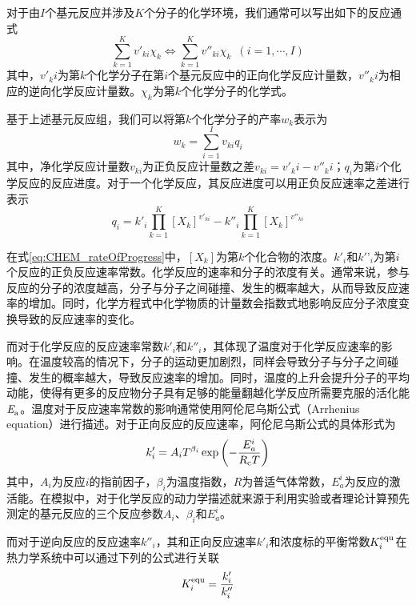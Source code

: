 对于由$I$个基元反应并涉及$K$个分子的化学环境，我们通常可以写出如下的反应通式
\begin{equation}
    \sum_{k=1}^Kv'_{ki}\chi_k\Leftrightarrow \sum_{k=1}^K v''_{ki}\chi_k\enspace\left(i=1,\cdots,I\right)
\end{equation}
其中，$v'_ki$为第$k$个化学分子在第$i$个基元反应中的正向化学反应计量数，$v''_ki$为相应的逆向化学反应计量数。$\chi_k$为第$k$个化学分子的化学式。

基于上述基元反应组，我们可以将第$k$个化学分子的产率$w_k$表示为\chinesecolon
\begin{equation}
    w_k=\sum_{i=1}^Iv_{ki}q_i
\end{equation}
其中，净化学反应计量数$v_{ki}$为正负反应计量数之差$v_{ki}=v'_ki-v''_ki$；$q_i$为第$i$个化学反应的反应进度。对于一个化学反应，其反应进度可以用正负反应速率之差进行表示\chinesecolon
\begin{equation}
    \label{eq:CHEM_rateOfProgress}
    q_i=k'_i\prod_{k=1}^{K}\left[X_k\right]^{v'_{ki}}-k''_i\prod_{k=1}^{K}\left[X_k\right]^{v''_{ki}}
\end{equation}

在式\ref{eq:CHEM_rateOfProgress}中，$\left[X_k\right]$为第$k$个化合物的浓度。$k'_i$和$k'’_i$为第$i$个反应的正负反应速率常数。化学反应的速率和分子的浓度有关。通常来说，参与反应的分子的浓度越高，分子与分子之间碰撞、发生的概率越大，从而导致反应速率的增加。同时，化学方程式中化学物质的计量数会指数式地影响反应分子浓度变换导致的反应速率的变化。

而对于化学反应的反应速率常数$k'_i$和$k''_i$，其体现了温度对于化学反应速率的影响。在温度较高的情况下，分子的运动更加剧烈，同样会导致分子与分子之间碰撞、发生的概率越大，导致反应速率的增加。同时，温度的上升会提升分子的平均动能，使得有更多的反应物分子具有足够的能量翻越化学反应所需要克服的活化能$\it E_{\rm a}^{\rm } \it$。温度对于反应速率常数的影响通常使用阿伦尼乌斯公式（Arrhenius equation）进行描述。对于正向反应的反应速率，阿伦尼乌斯公式的具体形式为\chinesecolon
\begin{equation}
    k'_i=A_iT^{\beta_i}\exp\left(-\frac{E_a^i}{R_{\rm c}T}\right)
\end{equation}
其中，$A_i$为反应$i$的指前因子，$\beta_i$为温度指数，$R$为普适气体常数，$E_a^i$为反应的激活能。在模拟中，对于化学反应的动力学描述就来源于利用实验或者理论计算预先测定的基元反应的三个反应参数$A_i$、$\beta_i$和$E_a^i$。

而对于逆向反应的反应速率$k''_i$，其和正向反应速率$k'_i$和浓度标的平衡常数$K_i^{\rm equ}$在热力学系统中可以通过下列的公式进行关联\chinesecolon
\[
    K_i^{\rm equ}=\frac{k'_i}{k''_i}
\]

